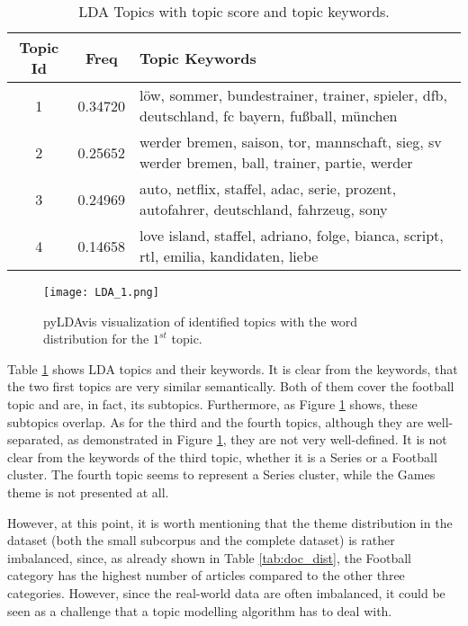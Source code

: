 \documentclass[fontsize=12pt,a4paper,twoside,openany]{scrbook}
\begin{document}
\renewcommand{\arraystretch}{2}
\begin{table}[ht]
    \centering
    \begin{tabularx}{\textwidth}{ |c|c|X| } 
        \hline
        \textbf{Topic Id} & \textbf{Freq} & \textbf{Topic Keywords} \\
        \hline
        1 & 0.34720 &  löw, sommer, bundestrainer, trainer, spieler, dfb, deutschland, fc bayern, fußball, münchen \\
        \hline
        2 & 0.25652 & werder bremen, saison, tor, mannschaft, sieg, sv werder bremen, ball, trainer, partie, werder \\
        \hline
        3 & 0.24969 & auto, netflix, staffel, adac, serie, prozent, autofahrer, deutschland, fahrzeug, sony \\
        \hline
        4 & 0.14658 &  love island, staffel, adriano, folge, bianca, script, rtl, emilia, kandidaten, liebe \\
        \hline
    \end{tabularx}
    \caption{LDA Topics with topic score and topic keywords.}
    \label{tab:lda_topic_keywords}
\end{table}
\renewcommand{\arraystretch}{1}

\begin{figure}[h]
\centering
\texttt{[image: LDA\_1.png]}
\caption{pyLDAvis visualization of identified topics with the word distribution for the \(1^{st}\) topic.}
\label{fig:lda_topics}
\end{figure}


Table \ref{tab:lda_topic_keywords} shows LDA topics and their keywords. It is clear from the keywords, that the two first topics are very similar semantically. Both of them cover the football topic and are, in fact, its subtopics. Furthermore, as Figure \ref{fig:lda_topics} shows, these subtopics overlap. As for the third and the fourth topics, although they are well-separated, as demonstrated in Figure \ref{fig:lda_topics}, they are not very well-defined. It is not clear from the keywords of the third topic, whether it is a Series or a Football cluster. The fourth topic seems to represent a Series cluster, while the Games theme is not presented at all.

However, at this point, it is worth mentioning that the theme distribution in the dataset (both the small subcorpus and the complete dataset) is rather imbalanced, since, as already shown in Table \ref{tab:doc_dist}, the Football category has the highest number of articles compared to the other three categories. However, since the real-world data are often imbalanced, it could be seen as a challenge that a topic modelling algorithm has to deal with.
\end{document}
